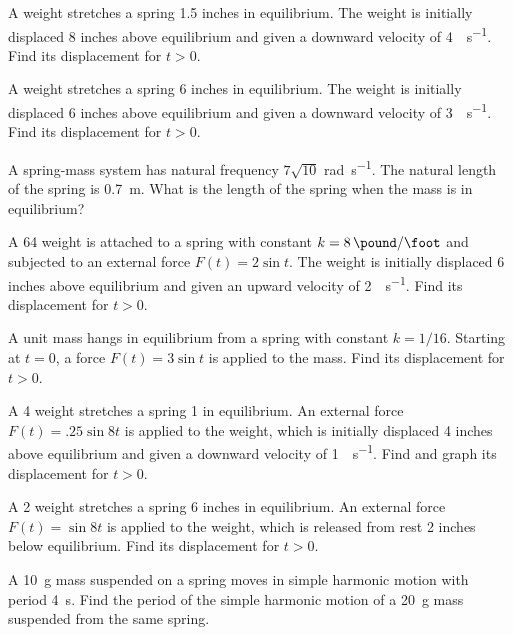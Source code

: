 \begin{exerciselist}
\item\label{exer:6.1.7}A  weight stretches a spring 1.5 inches in equilibrium. The weight
is initially displaced 8 inches above equilibrium and given a downward
velocity of \qty{4}{\feet\per\second}. Find its displacement for $t > 0$.

\item\label{exer:6.1.8}A weight stretches a spring 6 inches in equilibrium. The weight is
initially displaced 6 inches above equilibrium and given a downward
velocity of \qty{3}{\feet\per\second}. Find its displacement for $t>0$.

\item\label{exer:6.1.9}A spring-mass system has natural frequency $7\sqrt{10}$ \unit{\radian\per\second}. The
natural length of the spring is \qty{.7}{\meter}. What is the length of the spring
when the mass is in equilibrium?

\item\label{exer:6.1.10}A \qty{64}{\pound} weight is attached to a spring with constant $k=\qty{8}{\pound\per\foot}$ and
subjected to an external force $F(t)=2\sin t$. The weight is initially
displaced 6 inches above equilibrium and given an upward velocity of \qty{2}{\feet\per\second}. Find its displacement for $t>0$.

\item\label{exer:6.1.11}A unit mass hangs in equilibrium from a spring with constant $k=1/16$.
Starting at $t=0$, a force $F(t)=3\sin t$ is applied to the mass. Find
its displacement for $t>0$.

\item\label{exer:6.1.12}\CGex
A \qty{4}{\pound} weight stretches a spring \qty{1}{\foot} in equilibrium. An external
force $F(t)=.25\sin8 t$ \unit{\pound} is applied to the weight, which is
initially displaced 4 inches above equilibrium and given a downward
velocity of \qty{1}{\foot\per\second}. Find and graph its displacement for $t>0$.

\item\label{exer:6.1.13}A \qty{2}{\pound} weight stretches a spring 6 inches in equilibrium.  An external
force $F(t)=\sin8t$ \unit{\pound} is applied to the weight, which is released
from rest 2 inches below equilibrium. Find its displacement
for $t>0$.

\item\label{exer:6.1.14}A \qty{10}{\gram} mass suspended on a spring moves in simple harmonic
motion with period \qty{4}{\second}.  Find the period of the simple
harmonic motion of a \qty{20}{\gram} mass suspended from the same spring.



\end{exerciselist}
